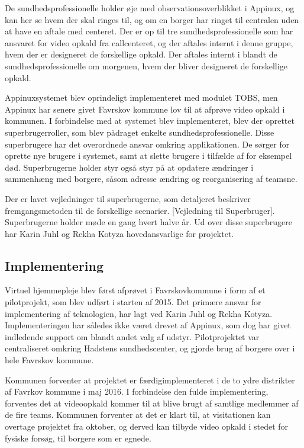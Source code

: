 De sundhedsprofessionelle holder øje med observationsoverblikket i Appinux, og kan her se hvem der skal ringes til, og om en borger har ringet til centralen uden at have en aftale med centeret. Der er op til tre sundhedsprofessionelle som har ansvaret for video opkald fra callcenteret, og der aftales internt i denne gruppe, hvem der er designeret de forskellige opkald.  Der aftales internt i blandt de sundhedsprofessionelle om morgenen, hvem der bliver designeret de forskellige opkald.

Appinuxsystemet blev oprindeligt implementeret med modulet TOBS, men Appinux har senere givet Favrskov kommune lov til at afprøve video opkald i kommunen. I forbindelse med at systemet blev implementeret, blev der oprettet superbrugerroller, som blev pådraget enkelte sundhedsprofessionelle. Disse superbrugere har det overordnede ansvar omkring applikationen. De sørger for oprette nye brugere i systemet, samt at slette brugere i tilfælde af for eksempel død. Superbrugerne holder styr også styr på at opdatere ændringer i sammenhæng med borgere, såsom adresse ændring og reorganisering af teamsne.

Der er lavet vejledninger til superbrugerne, som detaljeret beskriver fremgangsmetoden til de forskellige scenarier. [Vejledning til Superbruger]. Superbrugerne holder møde en gang hvert halve år. Ud over disse superbrugere har Karin Juhl og Rekha Kotyza hovedansvarlige for projektet. 

\subsection{Implementering}
Virtuel hjemmepleje blev først afprøvet i Favrskovkommune i form af et pilotprojekt, som blev udført i starten af 2015. Det primære ansvar for implementering af teknologien, har lagt ved Karin Juhl og Rekha Kotyza. Implementeringen har således ikke været drevet af Appinux, som dog har givet indledende support om blandt andet valg af udstyr. Pilotprojektet var centraliseret omkring Hadstens sundhedscenter, og gjorde brug af borgere over i hele Favrskov kommune. 

Kommunen forventer at projektet er færdigimplementeret i de to ydre distrikter af Favrkov kommune i maj 2016. I forbindelse den fulde implementering, forventes det at videoopkald kommer til at blive brugt af samtlige medlemmer af de fire teams. Kommunen forventer at det er klart til, at visitationen kan overtage projektet fra oktober, og derved kan tilbyde video opkald i stedet for fysiske forsøg, til borgere som er egnede.

